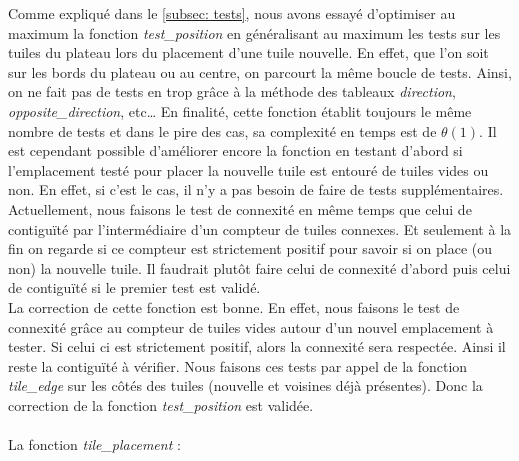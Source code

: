 \documentclass[11pt]{article}
\begin{document}
Comme expliqué dans le \ref{subsec: tests}, nous avons essayé d'optimiser au maximum la fonction \emph{test\_position} en généralisant au maximum les tests sur les tuiles du plateau lors du placement d'une tuile nouvelle. En effet, que l'on soit sur les bords du plateau ou au centre, on parcourt la même boucle de tests. Ainsi, on ne fait pas de tests en trop grâce à la méthode des tableaux \emph{direction}, \emph{opposite\_direction}, etc… En finalité, cette fonction établit toujours le même nombre de tests et dans le pire des cas, sa complexité en temps est de \( \theta(1) \). Il est cependant possible d'améliorer encore la fonction en testant d’abord si l'emplacement testé pour placer la nouvelle tuile est entouré de tuiles vides ou non. En effet, si c'est le cas, il n'y a pas besoin de faire de tests supplémentaires. Actuellement, nous faisons le test de connexité en même temps que celui de contiguïté par l'intermédiaire d'un compteur de tuiles connexes. Et seulement à la fin on regarde si ce compteur est strictement positif pour savoir si on place (ou non) la nouvelle tuile. Il faudrait plutôt faire celui de connexité d’abord puis celui de contiguïté si le premier test est validé. \\

La correction de cette fonction est bonne. En effet, nous faisons le test de connexité grâce au compteur de tuiles vides autour d'un nouvel emplacement à tester. Si celui ci est strictement positif, alors la connexité sera respectée. Ainsi il reste la contiguïté à vérifier. Nous faisons ces tests par appel de la fonction \emph{tile\_edge} sur les côtés des tuiles (nouvelle et voisines déjà présentes). Donc la correction de la fonction \emph{test\_position} est validée.\\ \\
La fonction \emph{tile\_placement} : \\
\end{document}

